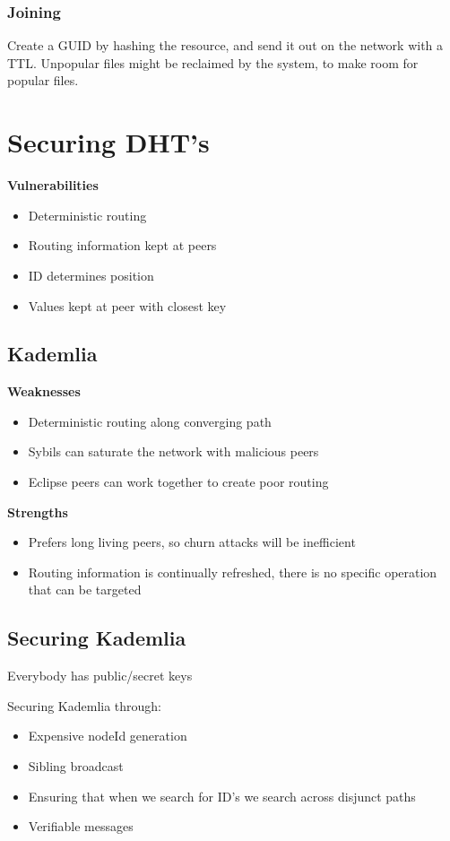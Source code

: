 	\subsubsection{Joining}
	Create a \gls{GUID} by hashing the resource, and send it out on the network with a \gls{TTL}. Unpopular files might be reclaimed by the system, to make room for popular files.
	
	\section{Securing DHT's}
	
	\textbf{Vulnerabilities}
	\begin{itemize}
		\item Deterministic routing
		\item Routing information kept at peers
		\item ID determines position
		\item Values kept at peer with closest key
	\end{itemize}
	
	\subsection{Kademlia}
	\textbf{Weaknesses}
	\begin{itemize}
		\item Deterministic routing along converging path
		\item Sybils can saturate the network with malicious peers
		\item Eclipse peers can work together to create poor routing
	\end{itemize}
	
	\textbf{Strengths}
	\begin{itemize}
		\item Prefers long living peers, so churn attacks will be inefficient
		\item Routing information is continually refreshed, there is no specific operation that can be targeted
	\end{itemize}
	
	
	\subsection{Securing Kademlia}
	Everybody has public/secret keys
	
	Securing Kademlia through:
	\begin{itemize}
		\item Expensive nodeId generation
		\item Sibling broadcast
		\item Ensuring that when we search for ID's we search across disjunct paths
		\item Verifiable messages
	\end{itemize}
	
